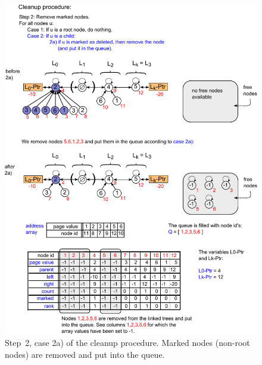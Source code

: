 \documentclass[a4paper,12pt, titlepage]{article}  %
\begin{document}
\begin{figure}[htp]
	\centering
	\includegraphics[scale=0.95]{./figures/java_implementation5.pdf}
	\caption{Step~2, case 2a) of the cleanup procedure. Marked nodes (non-root nodes) are removed and put into the queue.} 
	\label{fig:java_implementation5}
\end{figure}
\end{document}
